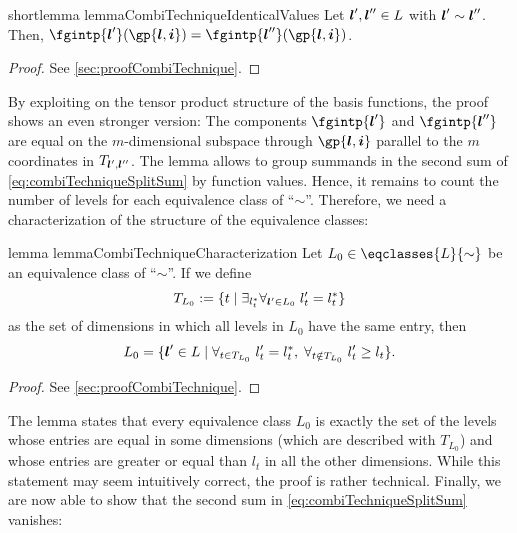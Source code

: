 \begin{restatable}{%
  shortlemma%
}{%
  lemmaCombiTechniqueIdenticalValues%
}
  \label{lemma:combiTechniqueIdenticalValues}
  Let ${\boldsymbol{l}}', {\boldsymbol{l}}'' \in L$ with ${\boldsymbol{l}}' \sim {\boldsymbol{l}}''$.
  Then, $\fgintp{\*l'}(\gp{\*l,\*i})
  = \fgintp{\*l''}(\gp{\*l,\*i})$.
\end{restatable}

\begin{proof}
  See \cref{sec:proofCombiTechnique}.
\end{proof}

By exploiting on the tensor product structure of the basis functions,
the proof shows an even stronger version:
The components $\fgintp{\*l'}$ and $\fgintp{\*l''}$ are equal
on the $m$-dimensional subspace through $\gp{\*l,\*i}$
parallel to the $m$ coordinates in $T_{{\boldsymbol{l}}',{\boldsymbol{l}}''}$.
The lemma allows to group summands in the second sum of
\eqref{eq:combiTechniqueSplitSum} by function values.
Hence, it remains to count the number of levels for
each equivalence class of ``$\sim$''.
Therefore, we need a characterization of the structure
of the equivalence classes:

\begin{restatable}{%
  lemma%
}{%
  lemmaCombiTechniqueCharacterization%
}
  \label{lemma:combiTechniqueCharacterization}
  Let $L_0 \in \eqclasses{L}{\sim}$ be an equivalence class of ``$\sim$''.
  If we define
  \begin{equation}
    T_{L_0}
    := \{t \mid \exists_{l^\ast_t} \forall_{{\boldsymbol{l}}' \in L_0}\;l'_t = l^\ast_t\}
  \end{equation}
  as the set of dimensions in which all levels in $L_0$
  have the same entry, then
  \begin{equation}
    L_0
    = \{{\boldsymbol{l}}' \in L \mid
    \forall_{t \in T_{L_0}}\;l'_t = l^\ast_t,\;
    \forall_{t \notin T_{L_0}}\;l'_t \ge l_t\}.
  \end{equation}
\end{restatable}

\begin{proof}
  See \cref{sec:proofCombiTechnique}.
\end{proof}

The lemma states that every equivalence class $L_0$ is exactly the
set of the levels whose entries are equal in some dimensions
(which are described with $T_{L_0}$)
and whose entries are greater or equal than $l_t$ in all the other dimensions.
While this statement may seem intuitively correct,
the proof is rather technical.
Finally, we are now able to show that the second sum in
\eqref{eq:combiTechniqueSplitSum} vanishes:

